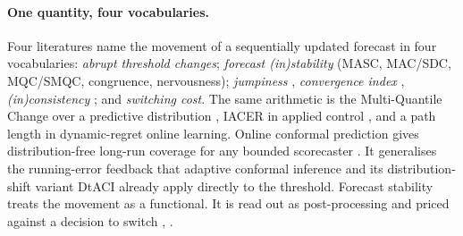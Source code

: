 \paragraph{One quantity, four vocabularies.} Four literatures name the movement of a
sequentially updated forecast in four vocabularies: \emph{abrupt threshold changes};
\emph{forecast (in)stability} (MASC, MAC/SDC, MQC/SMQC, congruence, nervousness);
\emph{jumpiness} \citep{zsoter2009jumpiness}, \emph{convergence index}
\citep{ehret2010convergence}, \emph{(in)consistency} \citep{pappenberger2011consistency}; and
\emph{switching cost}. The same arithmetic is the Multi-Quantile Change over a predictive
distribution \citep[v3, \S3.4.1]{zanotti2026smqc}, IACER in applied control
\citep{sarhadi2025criteria}, and a path length in dynamic-regret online learning.
Online conformal prediction gives distribution-free long-run coverage for any
bounded scorecaster \citep[Thm.~1, Prop.~2]{angelopoulos2023pid}. It generalises the running-error
feedback that adaptive conformal inference \citep{gibbs2021aci} and its distribution-shift variant
DtACI \citep{gibbs2024dtaci} already apply directly to the threshold.
Forecast stability
treats the movement as a functional. It is read out as post-processing
\citep[Eq.~3]{godahewa2025stability} and priced against a decision to switch
\citep[\S4.2]{genov2026switching}, \citep{vanbelle2026stabilizing}.

